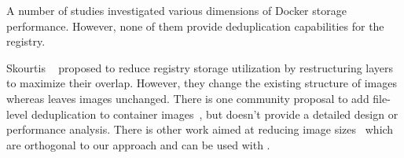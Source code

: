 

A number of studies investigated various dimensions of Docker storage
performance\cite{slacker,docker-driver-eval,improve-cow-container-drivers,dockerworkload,dedupanalysis,shifter,exoclones}. However, none
of them provide deduplication capabilities for the registry.

Skourtis \etal~\cite{skourtis2019carving} proposed to reduce registry storage utilization by
restructuring layers to maximize their overlap. However, they change
the existing structure of images whereas \sysname leaves images unchanged.
%
%
%
There is one community proposal to add file-level deduplication to container
images~\cite{Krohmer-proposal}, but doesn't provide a detailed design or performance
analysis.
%
There is other work aimed at reducing image sizes~\cite{cntr,rastogi2017cimplifier,gschwind2017optimizing,dockerslim} which are orthogonal to our approach and can be used  with \sysname.
%
%
